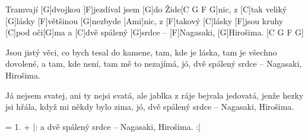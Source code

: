 
\sloka
[C]Tramvají [G]dvojkou [F]jezdíval jsem [G]do Žide[C G F G]nic,
z [C]tak veliký [G]lásky [F]většinou [G]nezbyde [Ami]nic,
z [F]takový [C]lásky [F]jsou kruhy [C]pod oči[G]ma
a [C]dvě spálený [G]srdce – [F]Nagasaki, [G]Hirošima. [C G F G]

\sloka
Jsou jistý věci, co bych tesal do kamene,
tam, kde je láska, tam je všechno dovolené,
a tam, kde není, tam mě to nezajímá,
jó, dvě spálený srdce – Nagasaki, Hirošima.

\sloka
Já nejsem svatej, ani ty nejsi svatá,
ale jablka z ráje bejvala jedovatá,
jenže hezky jsi hřála, když mi někdy bylo zima,
jó, dvě spálený srdce – Nagasaki, Hirošima.

\sloka
= 1. + |: a dvě spálený srdce – Nagasaki, Hirošima. :|

